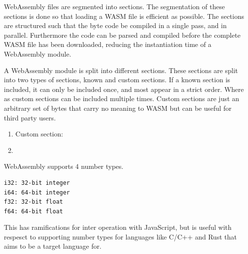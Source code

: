 \documentclass[11pt]{book}
\begin{document}
WebAssembly files are segmented into sections. The segmentation of these sections is done so that loading a WASM file is efficient as possible. The sections are structured such that the byte code be compiled in a single pass, and in parallel. Furthermore the code can be parsed and compiled before the complete WASM file has been downloaded, reducing the instantiation time of a WebAssembly module. 

A WebAssembly module is split into different sections. These sections are split into two types of sections, known and custom sections. If a known section is included, it can only be included once, and most appear in a strict order. Where as custom sections can be included multiple times. Custom sections are just an arbitrary set of bytes that carry no meaning to WASM but can be useful for third party users. 

\begin{enumerate}
\addtocounter{enumi}{-1}
\item Custom section: 
\item 
\end{enumerate}


WebAssembly supports 4 number types.
\begin{verbatim}
i32: 32-bit integer
i64: 64-bit integer
f32: 32-bit float
f64: 64-bit float
\end{verbatim}
This has ramifications for inter operation with JavaScript, but is useful with respesct to supporting number types for languages like C/C++ and Rust that aims to be a target language for. 
\end{document}
